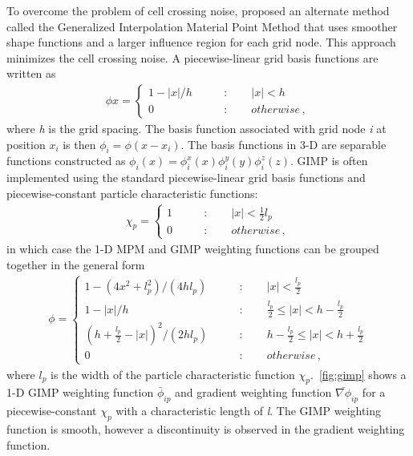 To overcome the problem of cell crossing 
noise, \citet{bardenhagen2004} proposed an alternate method called the 
Generalized Interpolation Material Point Method that uses smoother shape 
functions and a larger influence region for each grid node. This approach 
minimizes the cell crossing noise. A piecewise-linear grid basis functions are 
written as
%
\begin{align}
\phi{x} = \begin{cases}
1-\left|x\right|/h \qquad &: \qquad \left|x\right| < h \\
0 \qquad &: \qquad otherwise \,,
\end{cases}
\end{align}
where \textit{h} is the grid spacing. The basis function associated with grid 
node \textit{i} at position $x_i$ is then $\phi_i=\phi(x - x_i)$. The basis 
functions in 3-D are separable functions constructed as $\phi_i(x) = \phi_i^x(x)
\phi_i^y(y)\phi_i^z(z)$. GIMP is often implemented using the standard 
piecewise-linear grid basis functions and piecewise-constant particle 
characteristic functions:
\begin{align}
\chi_p = \begin{cases}
1 \qquad &: \qquad \left|x\right| < \frac{1}{2}l_p \\
0 \qquad &: \qquad otherwise \,,
\end{cases}
\end{align}
%
in which case the 1-D MPM and GIMP weighting functions can be grouped together 
in the general form
%
\begin{align}
\phi = \begin{cases}
1 - (4x^2+l_p^2)/(4hl_p)\qquad &: \qquad \left|x\right| < \frac{l_p}{2} \\
1 - \left|x\right|/h \qquad &: \qquad \frac{l_p}{2} \le \left|x\right| < h - 
\frac{l_p}{2} \\
\left(h +\frac{l_p}{2} - \left|x\right| \right)^2/(2hl_p) \qquad &: \qquad h - 
\frac{l_p}{2} \le \left|x\right| < h +
\frac{l_p}{2} \\
0 \qquad &: \qquad otherwise \,,
\end{cases}
\end{align}
%
where $l_p$ is the width of the particle characteristic function 
$\chi_p$.~\cref{fig:gimp} shows a 1-D GIMP weighting function $\bar{\phi}_{ip}$ 
and gradient weighting function $\bar{\nabla\phi}_{ip}$ for a 
piecewise-constant $\chi_p$ with a characteristic length of \textit{l}. The 
GIMP weighting function is smooth, however a discontinuity is observed in the 
gradient weighting function. 


